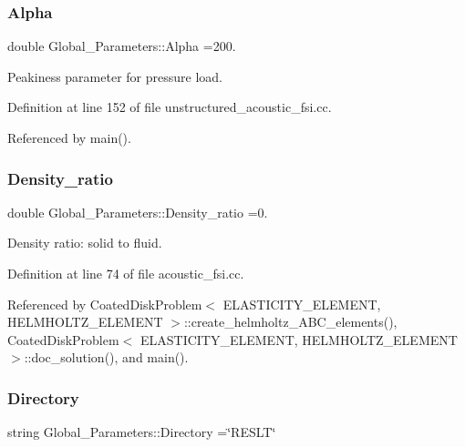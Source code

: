 \subsubsection{\texorpdfstring{Alpha}{Alpha}}
{\footnotesize\ttfamily double Global\+\_\+\+Parameters\+::\+Alpha =200.}



Peakiness parameter for pressure load. 



Definition at line 152 of file unstructured\+\_\+acoustic\+\_\+fsi.\+cc.



Referenced by main().

\mbox{\label{namespaceGlobal__Parameters_a517d4c31b8bce6563c2f605266dd9679}} 
\subsubsection{\texorpdfstring{Density\+\_\+ratio}{Density\_ratio}}
{\footnotesize\ttfamily double Global\+\_\+\+Parameters\+::\+Density\+\_\+ratio =0.}



Density ratio\+: solid to fluid. 



Definition at line 74 of file acoustic\+\_\+fsi.\+cc.



Referenced by Coated\+Disk\+Problem$<$ E\+L\+A\+S\+T\+I\+C\+I\+T\+Y\+\_\+\+E\+L\+E\+M\+E\+N\+T, H\+E\+L\+M\+H\+O\+L\+T\+Z\+\_\+\+E\+L\+E\+M\+E\+N\+T $>$\+::create\+\_\+helmholtz\+\_\+\+A\+B\+C\+\_\+elements(), Coated\+Disk\+Problem$<$ E\+L\+A\+S\+T\+I\+C\+I\+T\+Y\+\_\+\+E\+L\+E\+M\+E\+N\+T, H\+E\+L\+M\+H\+O\+L\+T\+Z\+\_\+\+E\+L\+E\+M\+E\+N\+T $>$\+::doc\+\_\+solution(), and main().

\mbox{\label{namespaceGlobal__Parameters_a301ab922df72030c660b21328d6caf76}} 
\subsubsection{\texorpdfstring{Directory}{Directory}}
{\footnotesize\ttfamily string Global\+\_\+\+Parameters\+::\+Directory =\char`\"{}R\+E\+S\+LT\char`\"{}}



